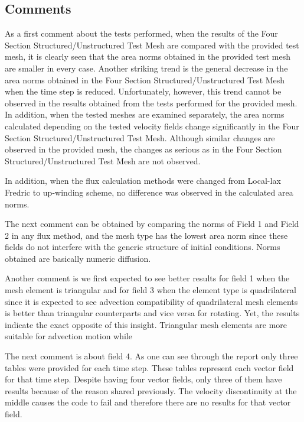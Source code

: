 \documentclass[a4paper, 12pt]{article}
\begin{document}
\subsection{Comments}

As a first comment about the tests performed, when the results of the Four Section Structured/Unstructured Test Mesh are compared with the provided test mesh, it is clearly seen that the area norms obtained in the provided test mesh are smaller in every case. Another striking trend is the general decrease in the area norms obtained in the Four Section Structured/Unstructured Test Mesh when the time step is reduced. Unfortunately, however, this trend cannot be observed in the results obtained from the tests performed for the provided mesh. In addition, when the tested meshes are examined separately, the area norms calculated depending on the tested velocity fields change significantly in the Four Section Structured/Unstructured Test Mesh. Although similar changes are observed in the provided mesh, the changes as serious as in the Four Section Structured/Unstructured Test Mesh are not observed. \\\par
In addition, when the flux calculation methods were changed from Local-lax Fredric to up-winding scheme, no difference was observed in the calculated area norms.\\\par

The next comment can be obtained by comparing the norms of Field 1 and Field 2 in any flux method, and the mesh type has the lowest area norm since these fields do not interfere with the generic structure of initial conditions. Norms obtained are basically numeric diffusion.\\\par

Another comment is we first expected to see better results for field 1 when the mesh element is triangular and for field 3 when the element type is quadrilateral since it is expected to see advection compatibility of quadrilateral mesh elements is better than triangular counterparts and vice versa for rotating. Yet, the results indicate the exact opposite of this insight. Triangular mesh elements are more suitable for advection motion while \\\par

 The next comment is about field 4. As one can see through the report only three tables were provided for each time step. These tables represent each vector field for that time step. Despite having four vector fields, only three of them have results because of the reason shared previously. The velocity discontinuity at the middle causes the code to fail and therefore there are no results for that vector field.\\\par
\end{document}
